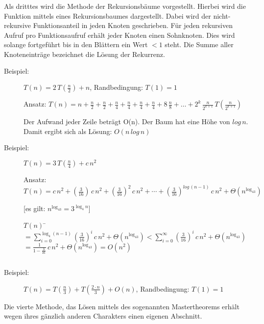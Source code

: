 \documentclass[ngerman]{scrreprt}%
\theoremstyle{break}
\begin{document}
Als dritttes wird die Methode der Rekursionsbäume vorgestellt.
Hierbei wird die Funktion mittels eines Rekursionsbaumes dargestellt. Dabei wird der nicht-rekursive Funktionsanteil in jeden Knoten
geschrieben. Für jeden rekursiven Aufruf pro Funktionsaufruf erhält jeder Knoten einen Sohnknoten. Dies wird solange fortgeführt bis
in den Blättern ein Wert $< 1$ steht. Die Summe aller Knoteneinträge bezeichnet die Lösung der Rekurrenz.
	\begin{description}
		\item [Beispiel:] $T(n) = 2\,T\left(\frac{n}{2}\right) + n$, Randbedingung: $T(1)=1$
			
		Ansatz: $T(n) = n + \frac{n}{2} + \frac{n}{2} + \frac{n}{4} + \frac{n}{4} + \frac{n}{4} + \frac{n}{4} + 8\,\frac{n}{8} + 
		\ldots + {2^k}\,\frac{n}{2^{k+1}}\,T\left(\frac{n}{2^{k+1}}\right)$
			
		
			
		Der Aufwand jeder Zeile beträgt O(n). Der Baum hat eine Höhe von $log\,n$. Damit ergibt sich als Lösung: 
		$O(n\,log\,n)$			
		
		\item [Beispiel:] $T(n) = 3\,T(\frac{n}{4}) + c\,n^2$
						
		Ansatz: $T(n) = c\,n^2 + \left(\frac{3}{16} \right)\,c\,n^2 + \left(\frac{3}{16}\right)^2\,c\,n^2 + \cdots +
		\left(\frac{3}{16}\right)^{log\,\left(n-1\right)}\,c\,n^2 + \Theta\left(n^{\log_43}\right)$
			
		[es gilt: $n^{\log_43}=3^{\log_4n}$]
			\begin{tabbing}
				$T(n)$ \= $= \sum_{i=0}^{\log_4\left(n-1\right)}\left(\frac{3}{16}\right)^i\,c\,n^2+ \Theta\left(n^{\log_43}\right) 
				< \sum_{i=0}^{\infty}\left(\frac{3}{16}\right)^i\,c\,n^2 + \Theta(n^{\log_43})$\\
				\> $= \frac{1}{1-\frac{3}{16}}\,c\,n^2 + \Theta(n^{\log_43})=O(n^2)$
			\end{tabbing}			
		$$  $$
	\end{description}
		
\begin{description}
	\item [Beispiel:] $T(n) = T\left(\frac{n}{3}\right) + T\left(\frac{2\cdot n}{3}\right) + O(n)$, Randbedingung: $T(1)=1$
	$$  $$
	\end{description}		
%
Die vierte Methode, das Lösen mittels des sogenannten Mastertheorems erhält wegen ihres gänzlich anderen Charakters einen eigenen
Abschnitt.
%
\end{document}
